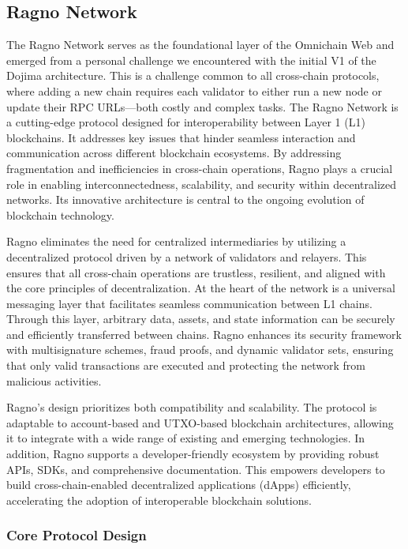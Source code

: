 \subsection{Ragno Network}

The Ragno Network serves as the foundational layer of the Omnichain Web and emerged from a personal challenge we encountered with the initial V1 of the Dojima architecture. This is a challenge common to all cross-chain protocols, where adding a new chain requires each validator to either run a new node or update their RPC URLs—both costly and complex tasks. The Ragno Network is a cutting-edge protocol designed for interoperability between Layer 1 (L1) blockchains. It addresses key issues that hinder seamless interaction and communication across different blockchain ecosystems. By addressing fragmentation and inefficiencies in cross-chain operations, Ragno plays a crucial role in enabling interconnectedness, scalability, and security within decentralized networks. Its innovative architecture is central to the ongoing evolution of blockchain technology.

Ragno eliminates the need for centralized intermediaries by utilizing a decentralized protocol driven by a network of validators and relayers. This ensures that all cross-chain operations are trustless, resilient, and aligned with the core principles of decentralization. At the heart of the network is a universal messaging layer that facilitates seamless communication between L1 chains. Through this layer, arbitrary data, assets, and state information can be securely and efficiently transferred between chains. Ragno enhances its security framework with multisignature schemes, fraud proofs, and dynamic validator sets, ensuring that only valid transactions are executed and protecting the network from malicious activities.

Ragno’s design prioritizes both compatibility and scalability. The protocol is adaptable to account-based and UTXO-based blockchain architectures, allowing it to integrate with a wide range of existing and emerging technologies. In addition, Ragno supports a developer-friendly ecosystem by providing robust APIs, SDKs, and comprehensive documentation. This empowers developers to build cross-chain-enabled decentralized applications (dApps) efficiently, accelerating the adoption of interoperable blockchain solutions.
\subsubsection{Core Protocol Design} 

